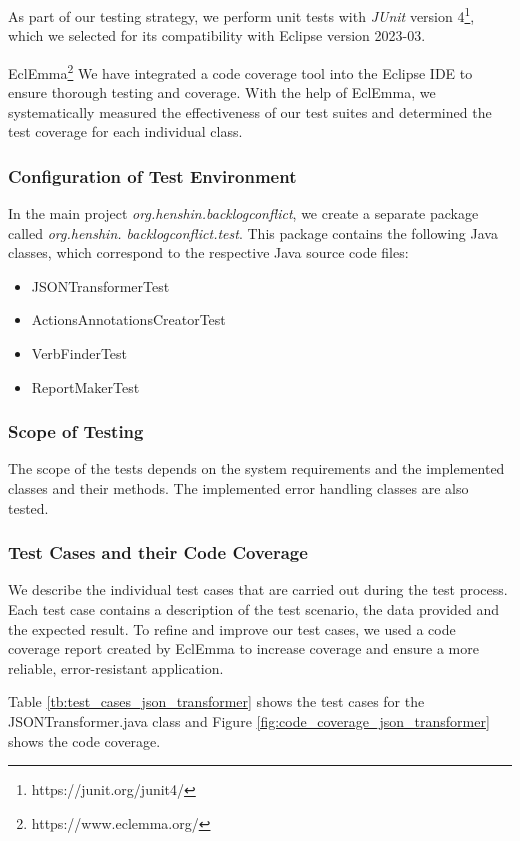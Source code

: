 As part of our testing strategy, we perform unit tests with \textit{JUnit} version 4\footnote{https://junit.org/junit4/}, which we selected for its compatibility with Eclipse version 2023-03. 

EclEmma\footnote{https://www.eclemma.org/} We have integrated a code coverage tool into the Eclipse IDE to ensure thorough testing and coverage. With the help of EclEmma, we systematically measured the effectiveness of our test suites and determined the test coverage for each individual class.
\subsubsection*{Configuration of Test Environment}
In the main project \textit{org.henshin.backlogconflict}, we create a separate package called \textit{org.henshin. backlogconflict.test}. This package contains the following Java classes, which correspond to the respective Java source code files:
\begin{itemize}
	
	\item JSONTransformerTest
	
	\item ActionsAnnotationsCreatorTest
	
	\item VerbFinderTest
	
	\item ReportMakerTest
	
\end{itemize}
\subsubsection*{Scope of Testing}
The scope of the tests depends on the system requirements and the implemented classes and their methods. The implemented error handling classes are also tested.
\subsubsection*{Test Cases and their Code Coverage}
We describe the individual test cases that are carried out during the test process. Each test case contains a description of the test scenario, the data provided and the expected result. To refine and improve our test cases, we used a code coverage report created by EclEmma to increase coverage and ensure a more reliable, error-resistant application.

Table \ref{tb:test_cases_json_transformer} shows the test cases for the JSONTransformer.java class and Figure \ref{fig:code_coverage_json_transformer} shows the code coverage.

